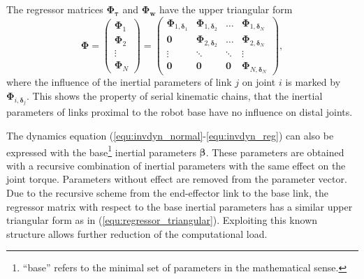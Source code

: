 \documentclass{svproc}
\newcommand{\bm}[1]{\boldsymbol{#1}}
\begin{document}
The regressor matrices $\bm{\Phi}_{\bm{\tau}}$ and 
$\bm{\Phi}_{\bm{w}}$
have the upper triangular form
\begin{equation}
\bm{\Phi}=
\begin{pmatrix} \bm{\Phi}_{1} \\ \bm{\Phi}_{2} \\ \vdots \\ \bm{\Phi}_{N}
\end{pmatrix}
=
\begin{pmatrix} \bm{\Phi}_{1,\bm{\delta}_1} & \bm{\Phi}_{1,\bm{\delta}_2} & \dots & \bm{\Phi}_{1,\bm{\delta}_N} \\
\bm{0} & \bm{\Phi}_{2,\bm{\delta}_2} & \dots & \bm{\Phi}_{2,\bm{\delta}_N} \\
\vdots & \ddots & \ddots & \vdots \\
\bm{0} & \bm{0} & \bm{0} & \bm{\Phi}_{N,\bm{\delta}_N}
\end{pmatrix},
\label{equ:regressor_triangular}
\end{equation}
where the influence of the inertial parameters of link $j$ on joint $i$ is marked by $\bm{\Phi}_{i,\bm{\delta}_j}$.
%
This shows the property of serial kinematic chains, that the inertial parameters of links proximal to the robot base have no influence on distal joints.

The dynamics equation (\ref{equ:invdyn_normal}-\ref{equ:invdyn_reg}) can also be expressed with the base\footnote{``base'' refers to the minimal set of parameters in the mathematical sense.} inertial parameters $\bm{\beta}$.
These parameters are obtained with a recursive combination of inertial parameters with the same effect on the joint torque.
Parameters without effect are removed from the parameter vector.
Due to the recursive scheme from the end-effector link to the base link, the regressor matrix with respect to the base inertial parameters has a similar upper triangular form as in (\ref{equ:regressor_triangular}).
Exploiting this known structure allows further reduction of the computational load.
\end{document}
